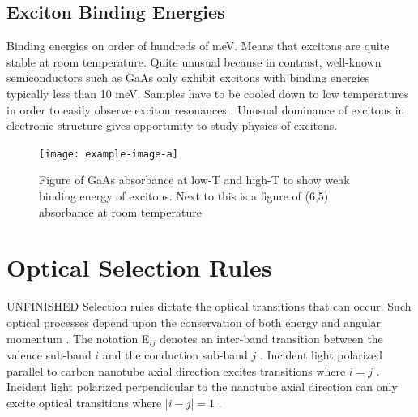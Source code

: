 \subsection{Exciton Binding Energies}


Binding energies on order of hundreds of meV. Means that excitons are quite stable at room temperature. Quite unusual because in contrast, well-known semiconductors such as GaAs only exhibit excitons with binding energies typically less than 10 meV. Samples have to be cooled down to low temperatures in order to easily observe exciton resonances \cite{liang1970excitons}. Unusual dominance of excitons in electronic structure gives opportunity to study physics of excitons.



\begin{figure}[h]
	\centering
	\texttt{[image: example-image-a]}
	\caption{Figure of GaAs absorbance at low-T and high-T to show weak binding energy of excitons. Next to this is a figure of  (6,5) absorbance at room temperature}
	\label{fig:gaas_vs_cnt_absorbance}
\end{figure}


\section{Optical Selection Rules}

{\color{red}UNFINISHED} Selection rules dictate the optical transitions that can occur. Such optical processes depend upon the conservation of both energy and angular momentum \cite{weismanKonoBook}. The notation E$_{ij}$ denotes an inter-band transition between the valence sub-band $i$ and the conduction sub-band $j$ \cite{weismanKonoBook}. Incident light polarized parallel to carbon nanotube axial direction excites transitions where $i=j$ \cite{weismanKonoBook}. Incident light polarized perpendicular to the nanotube axial direction can only excite optical transitions where $|i-j|=1$ \cite{weismanKonoBook}. 



